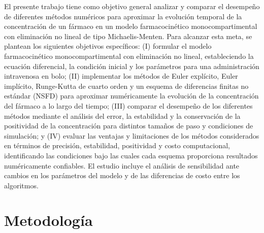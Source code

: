 \documentclass[11pt,final,5p,times,twocolumn,authoryear]{elsarticle}
\begin{document}
El presente trabajo tiene como objetivo general analizar y comparar el desempeño de diferentes métodos numéricos para aproximar la evolución temporal de la concentración de un fármaco en un modelo farmacocinético monocompartimental con eliminación no lineal de tipo Michaelis-Menten. Para alcanzar esta meta, se plantean los siguientes objetivos específicos: (I) formular el modelo farmacocinético monocompartimental con eliminación no lineal, estableciendo la ecuación diferencial, la condición inicial y los parámetros para una administración intravenosa en bolo; (II) implementar los métodos de Euler explícito, Euler implícito, Runge-Kutta de cuarto orden y un esquema de diferencias finitas no estándar (NSFD) para aproximar numéricamente la evolución de la concentración del fármaco a lo largo del tiempo; (III) comparar el desempeño de los diferentes métodos mediante el análisis del error, la estabilidad y la conservación de la positividad de la concentración para distintos tamaños de paso y condiciones de simulación; y (IV) evaluar las ventajas y limitaciones de los métodos considerados en términos de precisión, estabilidad, positividad y costo computacional, identificando las condiciones bajo las cuales cada esquema proporciona resultados numéricamente confiables. El estudio incluye el análisis de sensibilidad ante cambios en los parámetros del modelo y de las diferencias de costo entre los algoritmos.


\section{Metodología}
\label{metodologia}
\end{document}
